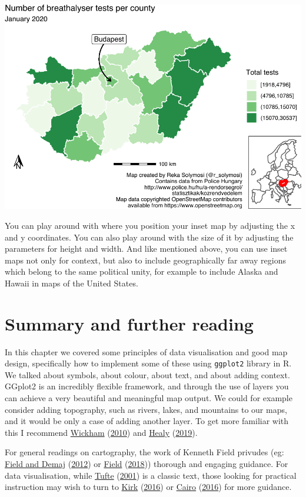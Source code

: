 \documentclass[
]{book}
\begin{document}
\includegraphics{crime_mapping_files/figure-latex/insetmapfinal-1.pdf}

You can play around with where you position your inset map by adjusting the x and y coordinates. You can also play around with the size of it by adjusting the parameters for height and width. And like mentioned above, you can use inset maps not only for context, but also to include geographically far away regions which belong to the same political unity, for example to include Alaska and Hawaii in maps of the United States.

\hypertarget{summary-and-further-reading-4}{%
\section{Summary and further reading}\label{summary-and-further-reading-4}}

In this chapter we covered some principles of data visualisation and good map design, specifically how to implement some of these using \texttt{ggplot2} library in R. We talked about symbols, about colour, about text, and about adding context. GGplot2 is an incredibly flexible framework, and through the use of layers you can achieve a very beautiful and meaningful map output. We could for example consider adding topography, such as rivers, lakes, and mountains to our maps, and it would be only a case of adding another layer. To get more familiar with this I recommend \protect\hyperlink{ref-Wickham_2010}{Wickham} (\protect\hyperlink{ref-Wickham_2010}{2010}) and \protect\hyperlink{ref-Healy_2019}{Healy} (\protect\hyperlink{ref-Healy_2019}{2019}).

For general readings on cartography, the work of Kenneth Field privudes (eg: \protect\hyperlink{ref-Field_2012}{Field and Demaj} (\protect\hyperlink{ref-Field_2012}{2012}) or \protect\hyperlink{ref-Field_2018}{Field} (\protect\hyperlink{ref-Field_2018}{2018})) thorough and engaging guidance. For data visualisation, while \protect\hyperlink{ref-Tufte_2001}{Tufte} (\protect\hyperlink{ref-Tufte_2001}{2001}) is a classic text, those looking for practical instruction may wish to turn to \protect\hyperlink{ref-Kirk_2016}{Kirk} (\protect\hyperlink{ref-Kirk_2016}{2016}) or \protect\hyperlink{ref-Cairo_2016}{Cairo} (\protect\hyperlink{ref-Cairo_2016}{2016}) for more guidance.
\end{document}
